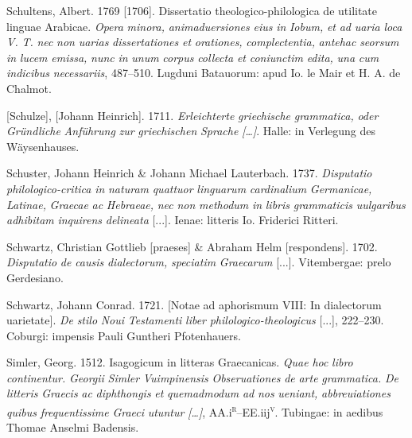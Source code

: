 \documentclass[output=paper]{langsci/langscibook}
\begin{document}
Schultens, Albert. 1769 [1706]. Dissertatio theologico-philologica de utilitate linguae Arabicae. \textit{Opera} \textit{minora,} \textit{animaduersiones} \textit{eius} \textit{in} \textit{Iobum,} \textit{et} \textit{ad} \textit{uaria} \textit{loca} \textit{V.} \textit{T.} \textit{nec} \textit{non} \textit{uarias} \textit{dissertationes} \textit{et} \textit{orationes,} \textit{complectentia,} \textit{antehac} \textit{seorsum} \textit{in} \textit{lucem} \textit{emissa,} \textit{nunc} \textit{in} \textit{unum} \textit{corpus} \textit{collecta} \textit{et} \textit{coniunctim} \textit{edita,} \textit{una} \textit{cum} \textit{indicibus} \textit{necessariis}, 487–510. Lugduni Batauorum: apud Io. le Mair et H. A. de Chalmot.

[Schulze], [Johann Heinrich]. 1711. \textit{Erleichterte} \textit{griechische} \textit{grammatica,} \textit{oder} \textit{Gründliche} \textit{Anführung} \textit{zur} \textit{griechischen} \textit{Sprache} \textit{[…]}. Halle: in Verlegung des Wäysenhauses.

Schuster, Johann Heinrich \& Johann Michael Lauterbach. 1737. \textit{Disputatio} \textit{philologico-critica} \textit{in} \textit{naturam} \textit{quattuor} \textit{linguarum} \textit{cardinalium} \textit{Germanicae,} \textit{Latinae,} \textit{Graecae} \textit{ac} \textit{Hebraeae,} \textit{nec} \textit{non} \textit{methodum} \textit{in} \textit{libris} \textit{grammaticis} \textit{uulgaribus} \textit{adhibitam} \textit{inquirens} \textit{delineata} [...]. Ienae: litteris Io. Friderici Ritteri.

Schwartz, Christian Gottlieb [praeses] \& Abraham Helm [respondens]. 1702. \textit{Disputatio} \textit{de} \textit{causis} \textit{dialectorum,} \textit{speciatim} \textit{Graecarum} [...]. Vitembergae: prelo Gerdesiano.

Schwartz, Johann Conrad. 1721. [Notae ad aphorismum VIII:  In dialectorum uarietate]. \textit{De} \textit{stilo} \textit{Noui} \textit{Testamenti} \textit{liber} \textit{philologico-theologicus} [...], 222–230. Coburgi: impensis Pauli Guntheri Pfotenhauers.

Simler, Georg. 1512. Isagogicum in litteras Graecanicas. \textit{Quae} \textit{hoc} \textit{libro} \textit{continentur.} \textit{Georgii} \textit{Simler} \textit{Vuimpinensis} \textit{Obseruationes} \textit{de} \textit{arte} \textit{grammatica.} \textit{De} \textit{litteris} \textit{Graecis} \textit{ac} \textit{diphthongis} \textit{et} \textit{quemadmodum} \textit{ad} \textit{nos} \textit{ueniant,} \textit{abbreuiationes} \textit{quibus} \textit{frequentissime} \textit{Graeci} \textit{utuntur} \textit{[…]}, AA.i\textsc{\textsuperscript{r}}–EE.iij\textsc{\textsuperscript{v}}. Tubingae: in aedibus Thomae Anselmi Badensis.
\end{document}
